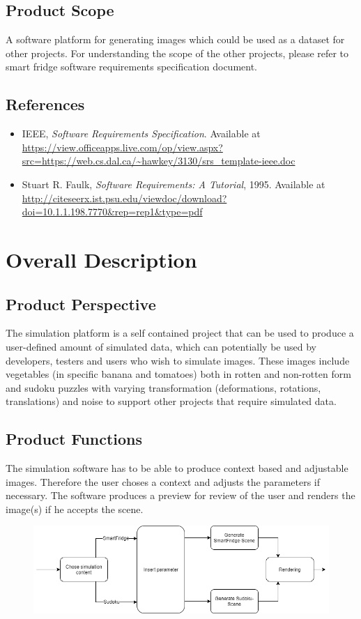 \documentclass[a4paper,12pt]{article}
\begin{document}
\subsection{Product Scope}
A software platform for generating images which could be used as a dataset for other projects. For understanding the scope of the other projects, please refer to smart fridge software requirements specification document.
\subsection{References}
\begin{itemize}
\item IEEE, \textit{Software Requirements Specification}. Available at \url{https://view.officeapps.live.com/op/view.aspx?src=https://web.cs.dal.ca/~hawkey/3130/srs_template-ieee.doc}
\item Stuart R. Faulk, \textit{Software Requirements: A Tutorial}, 1995. Available at \url{http://citeseerx.ist.psu.edu/viewdoc/download?doi=10.1.1.198.7770&rep=rep1&type=pdf}
\end{itemize}
\newpage
\section{Overall Description}
\subsection{Product Perspective}\label{ProductPerspective}
The simulation platform is a self contained project that can be used to produce a user-defined amount of simulated data, which can potentially be used by developers, testers and users who wish to simulate images. These images include vegetables (in specific banana and tomatoes) both in rotten and non-rotten form and sudoku puzzles with varying transformation (deformations, rotations, translations) and noise to support other projects that require simulated data.

\subsection{Product Functions}
The simulation software has to be able to produce context based and adjustable images.
Therefore the user choses a context and adjusts the parameters if necessary. The software produces a preview for review of the user and renders the image(s) if he accepts the scene.

\begin{figure}[H]
\includegraphics[scale=0.6]{sys_sw.png}
\end{figure}
\end{document}
